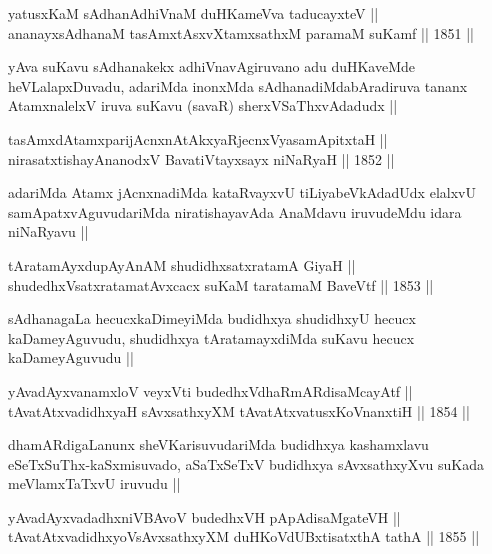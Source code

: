 \begin{shl}
yatusxKaM sAdhanAdhiVnaM duHKameVva taducayxteV ||  \\
ananayxsAdhanaM tasAmxtAsxvXtamxsathxM paramaM suKamf ||  1851 ||  
\end{shl}	

\begin{artha}
yAva suKavu sAdhanakekx adhiVnavAgiruvano adu duHKaveMde
heVLalapxDuvadu, adariMda inonxMda sAdhanadiMdabAradiruva tananx
AtamxnalelxV iruva suKavu (savaR) sherxVSaThxvAdadudx ||
\end{artha}

\begin{shl}
tasAmxdAtamxparijAcnxnAtAkxyaRjecnxVyasamApitxtaH || \\
nirasatxtishayAnanodxV BavatiVtayxsayx niNaRyaH ||  1852 ||  
\end{shl}

\begin{artha}
adariMda Atamx jAcnxnadiMda kataRvayxvU tiLiyabeVkAdadUdx elalxvU
samApatxvAguvudariMda niratishayavAda AnaMdavu iruvudeMdu idara
niNaRyavu ||
\end{artha}

\begin{shl}
tAratamAyxdupAyAnAM shudidhxsatxratamA GiyaH || \\
shudedhxVsatxratamatAvxcacx suKaM taratamaM BaveVtf ||  1853 ||  
\end{shl}

\begin{artha}
sAdhanagaLa hecucxkaDimeyiMda budidhxya shudidhxyU hecucx
kaDameyAguvudu, shudidhxya tAratamayxdiMda suKavu hecucx
kaDameyAguvudu ||
\end{artha}

\begin{shl}
yAvadAyxvanamxloV veyxVti budedhxVdhaRmARdisaMcayAtf || \\
tAvatAtxvadidhxyaH sAvxsathxyXM tAvatAtxvatusxKoVnanxtiH ||  1854 || 
\end{shl}

\begin{artha}
dhamARdigaLanunx sheVKarisuvudariMda budidhxya kashamxlavu
eSeTxSuThx-kaSxmisuvado, aSaTxSeTxV budidhxya sAvxsathxyXvu suKada
meVlamxTaTxvU iruvudu ||
\end{artha}

\begin{shl}
yAvadAyxvadadhxniVBAvoV budedhxVH pApAdisaMgateVH || \\
tAvatAtxvadidhxyoV\s sAvxsathxyXM duHKoVdUBxtisatxthA tathA ||  1855 ||  
\end{shl}

